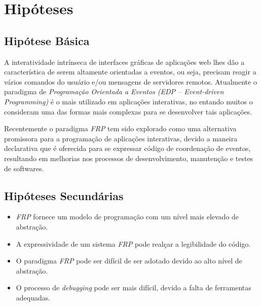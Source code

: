\section{Hipóteses}\label{lhipoteses}


\subsection{Hipótese Básica}

A interatividade intrínseca de interfaces gráficas de
aplicações web lhes dão a característica de serem altamente
orientadas a eventos,
ou seja, precisam reagir a vários comandos do usuário e/ou
mensagens de servidores remotos.
Atualmente o paradigma de \emph{Programação Orientada a
Eventos (EDP -- Event-driven Programming)} é o mais utilizado em
aplicações interativas, no entando muitos o consideram uma
das formas mais complexas para se desenvolver tais aplicações.

Recentemente o paradigma \emph{FRP} tem sido explorado como
uma alternativa promissora para a programação de aplicações
interativas, devido a maneira declarativa que é oferecida
para se expressar código de coordenação de eventos,
resultando em melhorias nos processos de desenvolvimento,
manutenção e testes de softwares.


\subsection{Hipóteses Secundárias}

\begin{itemize}[noitemsep]
  \item \emph{FRP} fornece um modelo de programação com um
        nível mais elevado de abstração.
  \item A expressividade de um sistema \emph{FRP} pode
        realçar a legibilidade do código.
  \item O paradigma \emph{FRP} pode ser difícil de ser adotado
        devido ao alto nível de abstração.
  \item O processo de \emph{debugging} pode ser mais difícil,
        devido a falta de ferramentas adequadas.
\end{itemize}

